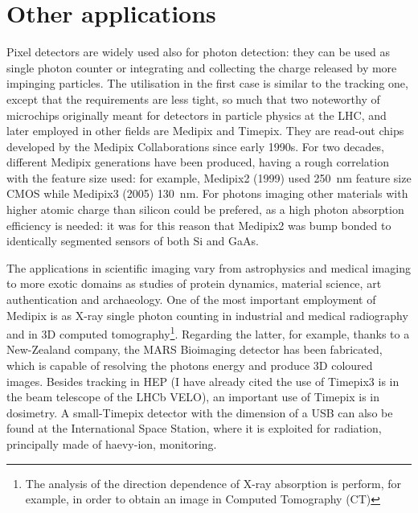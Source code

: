 \section{Other applications}
    Pixel detectors are widely used also for photon detection: they can be used as single photon counter or integrating and collecting the charge released by more impinging particles. The utilisation in the first case is similar to the tracking one, except that the requirements are less tight, so much that two noteworthy of microchips originally meant for detectors in particle physics at the LHC, and later employed in other fields are Medipix and Timepix. They are read-out chips developed by the Medipix Collaborations since early 1990s. For two decades, different Medipix generations have been produced, having a rough correlation with the feature size used: for example, Medipix2 (1999) used \SI{250}{nm} feature size CMOS while Medipix3 (2005) \SI{130}{nm}.
    For photons imaging other materials with higher atomic charge than silicon could be prefered, as a high photon absorption efficiency is needed: it was for this reason that Medipix2 was bump bonded to identically segmented sensors of both Si and GaAs.\cite{KOSTAMO2008174}
    
    The applications in scientific imaging vary from astrophysics and medical imaging to more exotic domains as studies of protein dynamics, material science, art authentication and archaeology.
    One of the most important employment of Medipix is as X-ray single photon counting in industrial and medical radiography and in 3D computed tomography\footnote{The analysis of the direction dependence of X-ray absorption is perform, for example, in order to obtain an image in Computed Tomography (CT)}. Regarding the latter, for example, thanks to a New-Zealand company, the MARS Bioimaging detector has been fabricated, which is capable of resolving the photons energy and produce 3D coloured images.
    Besides tracking in HEP (I have already cited the use of Timepix3 is in the beam telescope of the LHCb VELO), an important use of Timepix is in dosimetry.
    A small-Timepix detector with the dimension of a USB can also be found at the International Space Station, where it is exploited for radiation, principally made of haevy-ion, monitoring. 
 
